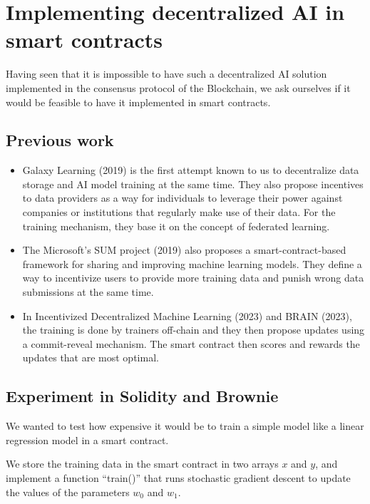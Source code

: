 \documentclass[conference]{IEEEtran}
\begin{document}
\section{Implementing decentralized AI in smart contracts}

Having seen that it is impossible to have such a decentralized AI solution implemented in the consensus protocol of the Blockchain, we ask ourselves if it would be feasible to have it implemented in smart contracts.

\subsection{Previous work}

\begin{itemize}
\item Galaxy Learning (2019)\cite{} is the first attempt known to us to decentralize data storage and AI model training at the same time. They also propose incentives to data providers as a way for individuals to leverage their power against companies or institutions that regularly make use of their data. For the training mechanism, they base it on the concept of federated learning.
\item The Microsoft's SUM project (2019)\cite{} also proposes a smart-contract-based framework for sharing and improving machine learning models. They define a way to incentivize users to provide more training data and punish wrong data submissions at the same time.
\item In Incentivized Decentralized Machine Learning (2023)\cite{} and BRAIN (2023)\cite{}, the training is done by trainers off-chain and they then propose updates using a commit-reveal mechanism. The smart contract then scores and rewards the updates that are most optimal.
\end{itemize}

\subsection{Experiment in Solidity and Brownie}

We wanted to test how expensive it would be to train a simple model like a linear regression model in a smart contract.

We store the training data in the smart contract in two arrays $x$ and $y$, and implement a function ``train()'' that runs stochastic gradient descent to update the values of the parameters $w_0$ and $w_1$.
\end{document}
